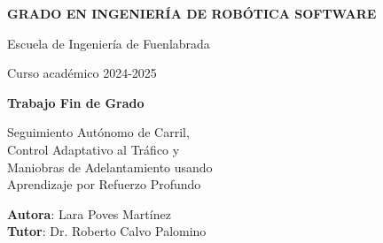 \thispagestyle{empty}
\vspace{2cm}

\begin{figure}[htb]
  \centerline{}
\end{figure}

\begin{center}
  {\Large {\bf GRADO EN INGENIERÍA DE ROBÓTICA SOFTWARE}}
  \vspace{5mm}
 
  {\large {Escuela de Ingeniería de Fuenlabrada}}
  \vspace{5mm}

  {\large {Curso académico 2024-2025}}

  \vspace{1cm}

  {\large {\bf Trabajo Fin de Grado}}

  \vspace{2cm}

  {\Large {Seguimiento Autónomo de Carril, \\
	Control Adaptativo al Tráfico y \\
	Maniobras de Adelantamiento usando\\
          Aprendizaje por Refuerzo Profundo\\[1cm] }}

  \vspace{5cm}
  {\bf Autora}: Lara Poves Martínez \\
  {\bf Tutor}: Dr. Roberto Calvo Palomino 

\end{center}

\clearpage
\thispagestyle{empty}
